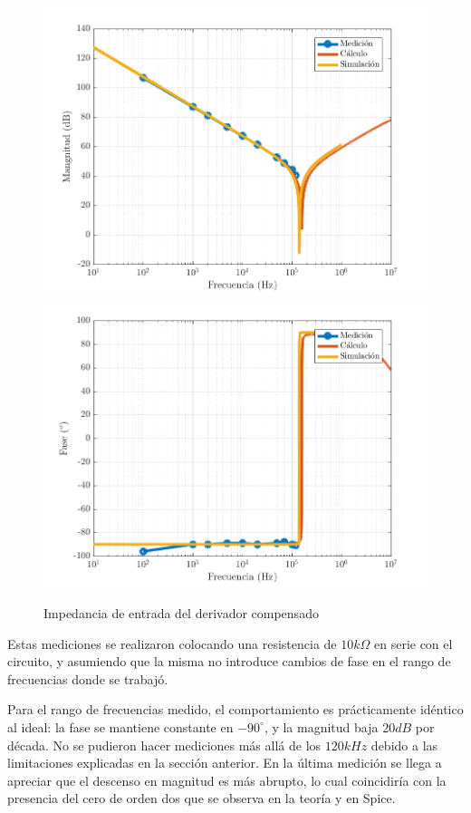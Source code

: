 \documentclass[../../main.tex]{subfiles}
\begin{document}
\begin{figure}  [H]
	\centering
	\label{fig:d-zin}
	\includegraphics[scale=0.7]{fotos/tc_tp2_ej4_d_Zin_mag.png}
	\includegraphics[scale=0.7]{fotos/tc_tp2_ej4_d_Zin_fase.png}
	\caption{Impedancia de entrada del derivador compensado}
\end{figure}

Estas mediciones se realizaron colocando una resistencia de $10k\Omega$ en serie con el circuito, y asumiendo que la misma no introduce cambios de fase en el rango de frecuencias donde se trabaj\'o. \par

Para el rango de frecuencias medido, el comportamiento es pr\'acticamente id\'entico al ideal: la fase se mantiene constante en $-90^\circ$, y la magnitud baja $20dB$ por d\'ecada. No se pudieron hacer mediciones m\'as all\'a de los $120kHz$ debido a las limitaciones explicadas en la secci\'on anterior. En la \'ultima medici\'on se llega a apreciar que el descenso en magnitud es m\'as abrupto, lo cual coincidir\'ia con la presencia del cero de orden dos que se observa en la teor\'ia y en Spice. \par
\end{document}
